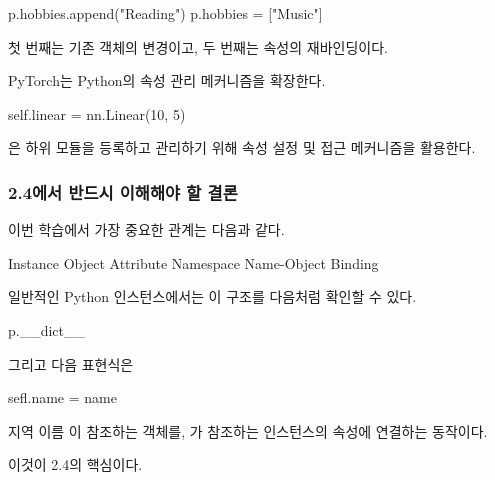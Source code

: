 \begin{dhkcode}
p.hobbies.append("Reading")
p.hobbies = ["Music"]
\end{dhkcode}

첫 번째는 기존 객체의 변경이고, 두 번째는 속성의 재바인딩이다.

\begin{dhknote}
\begin{dhksmry}[centered]
PyTorch는 Python의 속성 관리 메커니즘을 확장한다.
\end{dhksmry}
\end{dhknote}

\begin{dhkcode}
self.linear = nn.Linear(10, 5)
\end{dhkcode}

은 하위 모듈을 등록하고 관리하기 위해 속성 설정 및 접근 메커니즘을 활용한다.

\subsubsection{2.4에서 반드시 이해해야 할 결론}

이번 학습에서 가장 중요한 관계는 다음과 같다.

\begin{dhksmry}[centered]
Instance Object \ra Attribute Namespace \ra Name-Object Binding
\end{dhksmry}

일반적인 Python 인스턴스에서는 이 구조를 다음처럼 확인할 수 있다.

\begin{dhkcode}
p.__dict__
\end{dhkcode}

그리고 다음 표현식은

\begin{dhkcode}
sefl.name = name
\end{dhkcode}

지역 이름 이 참조하는 객체를, 가 참조하는 인스턴스의  속성에 연결하는 동작이다.

이것이 2.4의 핵심이다.